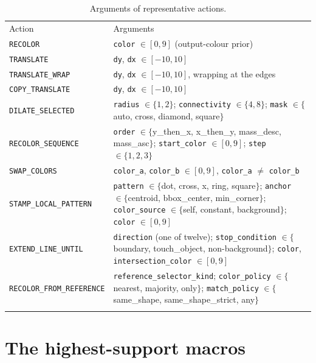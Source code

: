 \begin{table}[htbp]
\centering
\caption{Arguments of representative actions.}
\label{tab:app-actargs}
\small
\begin{tabular}{p{4.6cm}p{8.4cm}}
\hline\noalign{\smallskip}
Action & Arguments \\
\noalign{\smallskip}\hline\noalign{\smallskip}
\texttt{RECOLOR} & \texttt{color} $\in [0,9]$ (output-colour prior) \\
\texttt{TRANSLATE} & \texttt{dy}, \texttt{dx} $\in [-10,10]$ \\
\texttt{TRANSLATE\_WRAP} & \texttt{dy}, \texttt{dx} $\in [-10,10]$, wrapping at the edges \\
\texttt{COPY\_TRANSLATE} & \texttt{dy}, \texttt{dx} $\in [-10,10]$ \\
\texttt{DILATE\_SELECTED} & \texttt{radius} $\in \{1,2\}$; \texttt{connectivity} $\in \{4,8\}$; \texttt{mask} $\in \{$auto, cross, diamond, square$\}$ \\
\texttt{RECOLOR\_SEQUENCE} & \texttt{order} $\in \{$y\_then\_x, x\_then\_y, mass\_desc, mass\_asc$\}$; \texttt{start\_color} $\in [0,9]$; \texttt{step} $\in \{1,2,3\}$ \\
\texttt{SWAP\_COLORS} & \texttt{color\_a}, \texttt{color\_b} $\in [0,9]$, \texttt{color\_a} $\ne$ \texttt{color\_b} \\
\texttt{STAMP\_LOCAL\_PATTERN} & \texttt{pattern} $\in \{$dot, cross, x, ring, square$\}$; \texttt{anchor} $\in \{$centroid, bbox\_center, min\_corner$\}$; \texttt{color\_source} $\in \{$self, constant, background$\}$; \texttt{color} $\in [0,9]$ \\
\texttt{EXTEND\_LINE\_UNTIL} & \texttt{direction} (one of twelve); \texttt{stop\_condition} $\in \{$boundary, touch\_object, non-background$\}$; \texttt{color}, \texttt{intersection\_color} $\in [0,9]$ \\
\texttt{RECOLOR\_FROM\_REFERENCE} & \texttt{reference\_selector\_kind}; \texttt{color\_policy} $\in \{$nearest, majority, only$\}$; \texttt{match\_policy} $\in \{$same\_shape, same\_shape\_strict, any$\}$ \\
\noalign{\smallskip}\hline
\end{tabular}
\end{table}

\section{The highest-support macros}
\label{app:macrotable}

